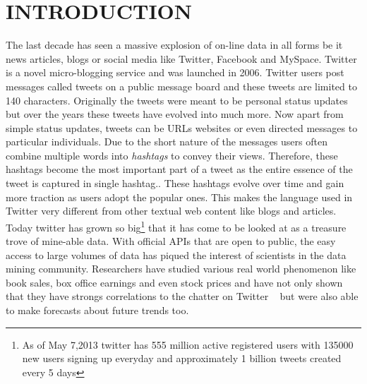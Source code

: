 \section{INTRODUCTION}
The last decade has seen a massive explosion of on-line data in all forms be it news articles, blogs or social media like Twitter, Facebook and MySpace.
Twitter is a novel micro-blogging service and was launched in 2006.
Twitter users post messages called tweets on a public message board  and these tweets are limited to 140 characters.
Originally the tweets were meant to be personal status updates but over the years these tweets have evolved into much more.
Now apart from simple status updates, tweets can be URLs websites or even directed messages to particular individuals.
Due to the short nature of the messages users often combine multiple words into \emph{hashtags} to convey their views.
Therefore, these hashtags become the most important part of a tweet as the entire essence of the tweet is captured in single hashtag.. 
These hashtags evolve over time and gain more traction as users adopt the popular ones.
This makes the language used in Twitter very different from other textual web content like blogs and articles.
\newline
Today twitter has grown so big\footnote{As of May 7,2013 twitter has 555 million active registered users with 135000 new users signing up everyday and approximately 1 billion tweets created every 5 days}
that it has come to be looked at as a treasure trove of mine-able data.
With official APIs that are open to public, the easy access to large volumes of data has piqued the interest of scientists in the data mining community.
Researchers have studied various real world phenomenon like book sales, box office earnings and even stock prices and have not only shown that they have  strongs correlations to the chatter on Twitter ~\cite{gruhl2005predictive,asur2010predicting,bollen2011twitter}
but were also able to make forecasts about future trends too.
